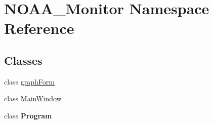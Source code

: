 \hypertarget{namespace_n_o_a_a___monitor}{}\section{N\+O\+A\+A\+\_\+\+Monitor Namespace Reference}
\label{namespace_n_o_a_a___monitor}
\subsection*{Classes}
\begin{DoxyCompactItemize}
\item 
class \mbox{\hyperlink{class_n_o_a_a___monitor_1_1graph_form}{graph\+Form}}
\item 
class \mbox{\hyperlink{class_n_o_a_a___monitor_1_1_main_window}{Main\+Window}}
\item 
class {\bfseries Program}
\end{DoxyCompactItemize}
